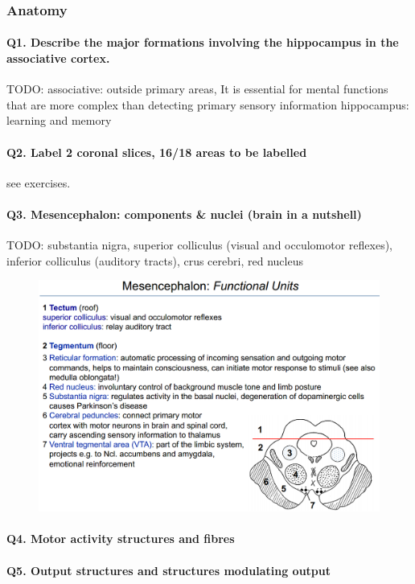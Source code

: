 \documentclass[12pt,article,oneside,a4paper]{memoir}
\begin{document}
\subsubsection{Anatomy}
\paragraph{Q1. Describe the major formations involving the hippocampus in the associative cortex.} 
TODO:
associative: outside primary areas, It is essential for mental functions that are more complex than detecting primary sensory information
hippocampus: learning and memory
\paragraph{Q2. Label 2 coronal slices, 16/18 areas to be labelled} see exercises.
\paragraph{Q3. Mesencephalon: components \& nuclei (brain in a nutshell)}
TODO:
substantia nigra, superior colliculus (visual  and occulomotor reflexes), inferior colliculus (auditory tracts), crus cerebri, red nucleus
\begin{figure}[H]
	\centering
  	\includegraphics[width=\linewidth]{imgs/mesencephalon_answer.png}
\end{figure}
\paragraph{Q4. Motor activity structures and fibres}


\paragraph{Q5. Output structures and structures modulating output}
\end{document}
